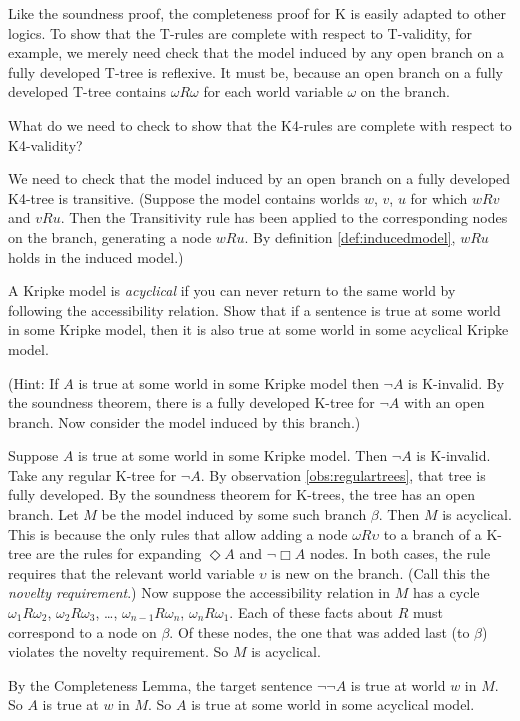 Like the soundness proof, the completeness proof for K is easily adapted to
other logics. To show that the T-rules are complete with respect to T-validity,
for example, we merely need check that the model induced by any open branch on a
fully developed T-tree is reflexive. It must be, because an open branch on a
fully developed T-tree contains $\omega R \omega$ for each world variable
$\omega$ on the branch.


\begin{exercise}
  What do we need to check to show that the K4-rules are complete with respect
  to K4-validity?
\end{exercise}
\begin{solution}
  We need to check that the model induced by an open branch on a fully developed
  K4-tree is transitive. (Suppose the model contains worlds $w$, $v$, $u$ for
  which $wRv$ and $vRu$. Then the Transitivity rule has been applied to the
  corresponding nodes on the branch, generating a node $wRu$. By definition
  \ref{def:inducedmodel}, $wRu$ holds in the induced model.)
\end{solution}

\begin{exercise}\label{ex:acyclical}
  A Kripke model is \emph{acyclical} if you can never return to the same world
  by following the accessibility relation. Show that if a sentence is true at
  some world in some Kripke model, then it is also true at some world in some
  acyclical Kripke model.

  (Hint: If $A$ is true at some world in some Kripke model then $\neg A$ is
  K-invalid. By the soundness theorem, there is a fully developed K-tree for
  $\neg A$ with an open branch. Now consider the model induced by this branch.)
\end{exercise}
\begin{solution}
  Suppose $A$ is true at some world in some Kripke model. Then $\neg A$ is
  K-invalid. Take any regular K-tree for $\neg A$. By observation
  \ref{obs:regulartrees}, that tree is fully developed. By the soundness theorem
  for K-trees, the tree has an open branch. Let $M$ be the model induced by some
  such branch $\beta$. Then $M$ is acyclical. This is because the only rules
  that allow adding a node $\omega R \upsilon$ to a branch of a K-tree are the
  rules for expanding $\Diamond A$ and $\neg\Box A$ nodes. In both cases, the
  rule requires that the relevant world variable $\upsilon$ is new on the
  branch. (Call this the \emph{novelty requirement}.) Now suppose the
  accessibility relation in $M$ has a cycle $\omega_{1} R \omega_{2}$,
  $\omega_{2} R \omega_{3}$, \ldots, $\omega_{n-1} R \omega_{n}$,
  $\omega_{n} R \omega_{1}$. Each of these facts about $R$ must correspond to a
  node on $\beta$. Of these nodes, the one that was added last (to $\beta$)
  violates the novelty requirement. So $M$ is acyclical.

  By the Completeness Lemma, the target sentence $\neg\neg A$ is true at world
  $w$ in $M$. So $A$ is true at $w$ in $M$. So $A$ is true at some world in some acyclical model.
\end{solution}

